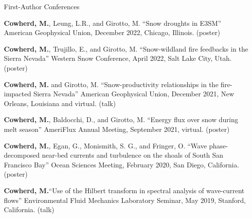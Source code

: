 \documentclass{cv}
\begin{document}
\begin{cSection}{First-Author Conferences}
\item \textbf{Cowherd, M.}, Leung, L.R., and Girotto, M. ``Snow droughts in E3SM'' American Geophysical Union, December 2022, Chicago, Illinois. (poster)
\item \textbf{Cowherd, M.}, Trujillo, E., and Girotto, M. ``Snow-wildland fire feedbacks in the Sierra Nevada'' Western Snow Conference, April 2022, Salt Lake City, Utah. (poster)
\item \textbf{Cowherd, M.} and Girotto, M. ``Snow-productivity relationships in the fire-impacted Sierra Nevada'' American Geophysical Union, December 2021, New Orleans, Louisiana and virtual. (talk)
\item \textbf{Cowherd, M.}, Baldocchi, D., and Girotto, M. ``Energy flux over snow during melt season'' AmeriFlux Annual Meeting, September 2021, virtual. (poster)
\item \textbf{Cowherd, M.}, Egan, G., Monismith, S. G., and Fringer, O. ``Wave phase-decomposed near-bed currents and turbulence on the shoals of South San Francisco Bay'' Ocean Sciences Meeting, February 2020, San Diego, California. (poster)
\item \textbf{Cowherd, M.}``Use of the Hilbert transform in spectral analysis of wave-current flows'' Environmental Fluid Mechanics Laboratory Seminar, May 2019, Stanford, California. (talk)
\end{cSection}
\end{document}
